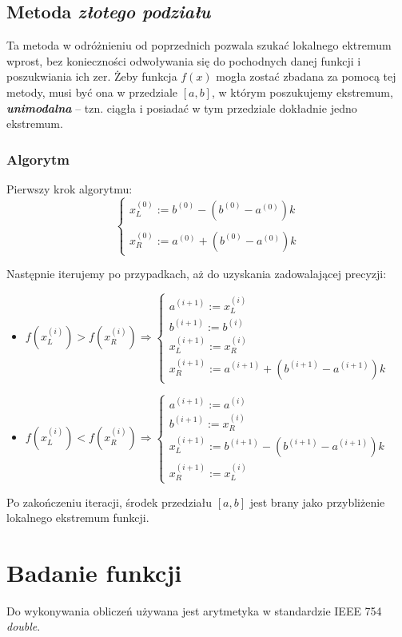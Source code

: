 \documentclass[a4paper,11pt]{article}
\begin{document}
  \subsection{Metoda \emph{złotego podziału}}
    Ta metoda w odróżnieniu od poprzednich pozwala szukać lokalnego ektremum wprost, bez konieczności odwoływania się do pochodnych danej funkcji i poszukwiania ich zer. Żeby funkcja \( f(x) \) mogła zostać zbadana za pomocą tej metody, musi być ona w przedziale \( [a,b] \), w którym poszukujemy ekstremum, \textbf{\emph{unimodalna}} -- tzn. ciągła i posiadać w tym przedziale dokładnie jedno ekstremum.
    \subsubsection{Algorytm}
    Pierwszy krok algorytmu:
    $$ \left\{\begin{array}{l}
    x_L^{(0)} := b^{(0)} - (b^{(0)}-a^{(0)})k \\ \\
    x_R^{(0)} := a^{(0)} + (b^{(0)}-a^{(0)})k
    \end{array}\right. $$
    
    Następnie iterujemy po przypadkach, aż do uzyskania zadowalającej precyzji:
    \begin{itemize}
      \item \( f(x_L^{(i)}) > f(x_R^{(i)}) \Rightarrow \left\{\begin{array}{l}
        a^{(i+1)} := x_L^{(i)} \\
        b^{(i+1)} := b^{(i)} \\
        x_L^{(i+1)} := x_R^{(i)} \\
        x_R^{(i+1)} := a^{(i+1)} + (b^{(i+1)}-a^{(i+1)})k
        \end{array}\right. \)
      \item \( f(x_L^{(i)}) < f(x_R^{(i)}) \Rightarrow \left\{\begin{array}{l}
        a^{(i+1)} := a^{(i)} \\
        b^{(i+1)} := x_R^{(i)} \\
        x_L^{(i+1)} := b^{(i+1)} - (b^{(i+1)}-a^{(i+1)})k \\
        x_R^{(i+1)} := x_L^{(i)}
        \end{array}\right. \)
    \end{itemize}
    Po zakończeniu iteracji, środek przedziału $[a,b]$ jest brany jako przybliżenie lokalnego ekstremum funkcji.
  \section{Badanie funkcji}
    Do wykonywania obliczeń używana jest arytmetyka w standardzie IEEE 754 \emph{double}.
\end{document}

